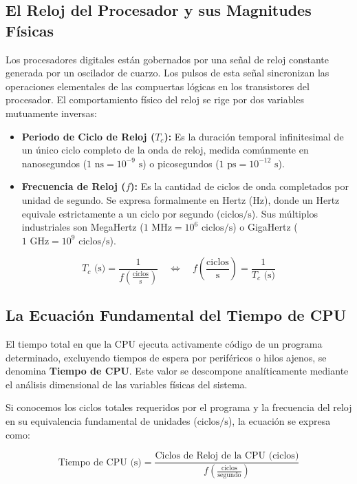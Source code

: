 \documentclass[12pt,letterpaper]{article}
\begin{document}
\subsection{El Reloj del Procesador y sus Magnitudes Físicas}
Los procesadores digitales están gobernados por una señal de reloj constante generada por un oscilador de cuarzo. Los pulsos de esta señal sincronizan las operaciones elementales de las compuertas lógicas en los transistores del procesador. El comportamiento físico del reloj se rige por dos variables mutuamente inversas:

\begin{itemize}
    \item \textbf{Periodo de Ciclo de Reloj ($T_c$):} Es la duración temporal infinitesimal de un único ciclo completo de la onda de reloj, medida comúnmente en nanosegundos ($1\text{ ns} = 10^{-9}\text{ s}$) o picosegundos ($1\text{ ps} = 10^{-12}\text{ s}$).
    \item \textbf{Frecuencia de Reloj ($f$):} Es la cantidad de ciclos de onda completados por unidad de segundo. Se expresa formalmente en Hertz ($\text{Hz}$), donde un Hertz equivale estrictamente a un ciclo por segundo ($\text{ciclos}/\text{s}$). Sus múltiplos industriales son MegaHertz ($1\text{ MHz} = 10^6\text{ ciclos}/\text{s}$) o GigaHertz ($1\text{ GHz} = 10^9\text{ ciclos}/\text{s}$).
\end{itemize}

\begin{equation}
T_c \text{ (s)} = \frac{1}{f \left(\frac{\text{ciclos}}{\text{s}}\right)} \quad \Longleftrightarrow \quad f \left(\frac{\text{ciclos}}{\text{s}}\right) = \frac{1}{T_c \text{ (s)}}
\end{equation}

\subsection{La Ecuación Fundamental del Tiempo de CPU}
El tiempo total en que la CPU ejecuta activamente código de un programa determinado, excluyendo tiempos de espera por periféricos o hilos ajenos, se denomina \textbf{Tiempo de CPU}. Este valor se descompone analíticamente mediante el análisis dimensional de las variables físicas del sistema. 

Si conocemos los ciclos totales requeridos por el programa y la frecuencia del reloj en su equivalencia fundamental de unidades ($\text{ciclos}/\text{s}$), la ecuación se expresa como:

\begin{equation}
\text{Tiempo de CPU (s)} = \frac{\text{Ciclos de Reloj de la CPU (ciclos)}}{f \left(\frac{\text{ciclos}}{\text{segundo}}\right)}
\end{equation}
\end{document}
